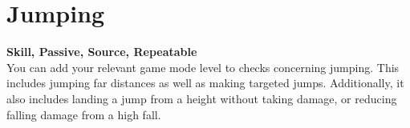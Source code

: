 \section{Jumping}\label{sec:jumping}
\textbf{Skill, Passive, Source, Repeatable}\\
You can add your relevant game mode level to checks concerning jumping.
This includes jumping far distances as well as making targeted jumps.
Additionally, it also includes landing a jump from a height without taking damage, or reducing falling damage from a high fall.